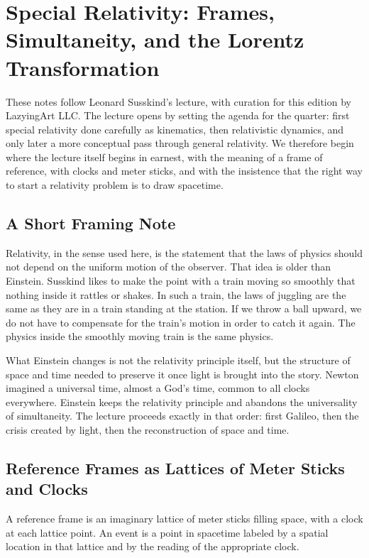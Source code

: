 \chapter{Special Relativity: Frames, Simultaneity, and the Lorentz Transformation}

These notes follow Leonard Susskind's lecture, with curation for this edition by LazyingArt LLC. The lecture opens by setting the agenda for the quarter: first special relativity done carefully as kinematics, then relativistic dynamics, and only later a more conceptual pass through general relativity. We therefore begin where the lecture itself begins in earnest, with the meaning of a frame of reference, with clocks and meter sticks, and with the insistence that the right way to start a relativity problem is to draw spacetime.

\section{A Short Framing Note}

Relativity, in the sense used here, is the statement that the laws of physics should not depend on the uniform motion of the observer. That idea is older than Einstein. Susskind likes to make the point with a train moving so smoothly that nothing inside it rattles or shakes. In such a train, the laws of juggling are the same as they are in a train standing at the station. If we throw a ball upward, we do not have to compensate for the train's motion in order to catch it again. The physics inside the smoothly moving train is the same physics.

What Einstein changes is not the relativity principle itself, but the structure of space and time needed to preserve it once light is brought into the story. Newton imagined a universal time, almost a God's time, common to all clocks everywhere. Einstein keeps the relativity principle and abandons the universality of simultaneity. The lecture proceeds exactly in that order: first Galileo, then the crisis created by light, then the reconstruction of space and time.

\section{Reference Frames as Lattices of Meter Sticks and Clocks}

\begin{definition}
A reference frame is an imaginary lattice of meter sticks filling space, with a clock at each lattice point. An event is a point in spacetime labeled by a spatial location in that lattice and by the reading of the appropriate clock.
\end{definition}

